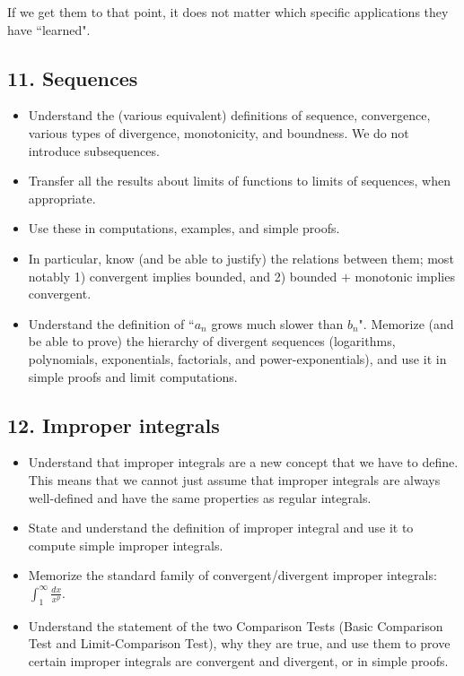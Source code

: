 \documentclass[11pt]{article}
\begin{document}
	If we get them to that point, it does not matter which specific applications
	they have ``learned".

	\subsection{11. Sequences}

	\begin{itemize}
		\item Understand the (various equivalent) definitions of sequence,
			convergence, various types of divergence, monotonicity, and boundness. We
			do not introduce subsequences.

		\item Transfer all the results about limits of functions to limits of sequences,
			when appropriate.

		\item Use these in computations, examples, and simple proofs.

		\item In particular, know (and be able to justify) the relations between
			them; most notably 1) convergent implies bounded, and 2) bounded $+$
			monotonic implies convergent.

		\item Understand the definition of ``$a_{n}$ grows much slower than $b_{n}$".
			Memorize (and be able to prove) the hierarchy of divergent sequences (logarithms,
			polynomials, exponentials, factorials, and power-exponentials), and use it
			in simple proofs and limit computations.
	\end{itemize}

	\subsection{12. Improper integrals}

	\begin{itemize}
		\item Understand that improper integrals are a new concept that we have to define.
			This means that we cannot just assume that improper integrals are always
			well-defined and have the same properties as regular integrals.

		\item State and understand the definition of improper integral and use it to
			compute simple improper integrals.

		\item Memorize the standard family of convergent/divergent improper integrals:
			${\displaystyle \int^{\infty}_1 \frac{dx}{x^{p}}}$.

		\item Understand the statement of the two Comparison Tests (Basic Comparison
			Test and Limit-Comparison Test), why they are true, and use them to prove certain
			improper integrals are convergent and divergent, or in simple proofs.
	\end{itemize}
\end{document}
